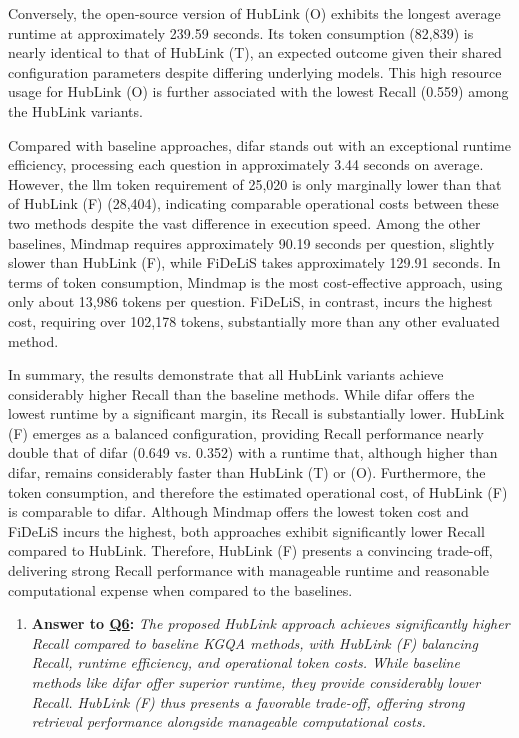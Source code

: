 Conversely, the open-source version of HubLink (O) exhibits the longest average runtime at approximately 239.59 seconds. Its token consumption (82,839) is nearly identical to that of HubLink (T), an expected outcome given their shared configuration parameters despite differing underlying models. This high resource usage for HubLink (O) is further associated with the lowest Recall (0.559) among the HubLink variants.

Compared with baseline approaches, \gls{difar} stands out with an exceptional runtime efficiency, processing each question in approximately 3.44 seconds on average. However, the \gls{llm} token requirement of 25,020 is only marginally lower than that of HubLink (F) (28,404), indicating comparable operational costs between these two methods despite the vast difference in execution speed. Among the other baselines, Mindmap requires approximately 90.19 seconds per question, slightly slower than HubLink (F), while FiDeLiS takes approximately 129.91 seconds. In terms of token consumption, Mindmap is the most cost-effective approach, using only about 13,986 tokens per question. FiDeLiS, in contrast, incurs the highest cost, requiring over 102,178 tokens, substantially more than any other evaluated method.

In summary, the results demonstrate that all HubLink variants achieve considerably higher Recall than the baseline methods. While \gls{difar} offers the lowest runtime by a significant margin, its Recall is substantially lower. HubLink (F) emerges as a balanced configuration, providing Recall performance nearly double that of \gls{difar} (0.649 vs. 0.352) with a runtime that, although higher than \gls{difar}, remains considerably faster than HubLink (T) or (O). Furthermore, the token consumption, and therefore the estimated operational cost, of HubLink (F) is comparable to \gls{difar}. Although Mindmap offers the lowest token cost and FiDeLiS incurs the highest, both approaches exhibit significantly lower Recall compared to HubLink. Therefore, HubLink (F) presents a convincing trade-off, delivering strong Recall performance with manageable runtime and reasonable computational expense when compared to the baselines.


\begin{enumerate}[label={}]
    \item \textbf{Answer to \hyperref[sec:evaluation_gqm_plan]{Q6}:} \textit{The proposed HubLink approach achieves significantly higher Recall compared to baseline KGQA methods, with HubLink (F) balancing Recall, runtime efficiency, and operational token costs. While baseline methods like \gls{difar} offer superior runtime, they provide considerably lower Recall. HubLink (F) thus presents a favorable trade-off, offering strong retrieval performance alongside manageable computational costs.}
\end{enumerate}

